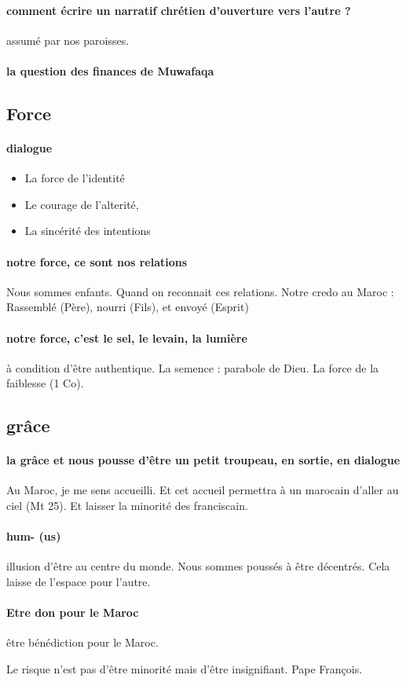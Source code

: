 \paragraph{comment écrire un narratif chrétien d’ouverture vers l’autre ? } assumé par nos paroisses. 
\paragraph{la question des finances de Muwafaqa}

\subsection{Force}
\paragraph{dialogue}
\begin{itemize}
\item La force de l’identité
\item Le courage de l’alterité, 
\item La sincérité des intentions
\end{itemize}
\paragraph{notre force, ce sont nos relations } Nous sommes enfants. Quand on reconnait ces relations. Notre credo au Maroc : Rassemblé (Père), nourri (Fils), et envoyé (Esprit)
\paragraph{notre force, c’est le sel, le levain, la lumière} à condition d’être authentique. La semence : parabole de Dieu. La force de la faiblesse (1 Co).

\subsection{grâce}
\paragraph{la grâce et nous pousse d’être un petit troupeau, en sortie, en dialogue} Au Maroc, je me sens accueilli. Et cet accueil permettra à un marocain d’aller au ciel (Mt 25).
Et laisser la minorité des franciscain.
\paragraph{hum- (us) } illusion d’être au centre du monde. Nous sommes poussés à être décentrés. Cela laisse de l’espace pour l’autre. 
\paragraph{Etre don pour le Maroc} être bénédiction pour le Maroc.

\begin{Synthesis}
Le risque n’est pas d’être minorité mais d’être insignifiant. Pape François.
\end{Synthesis}






